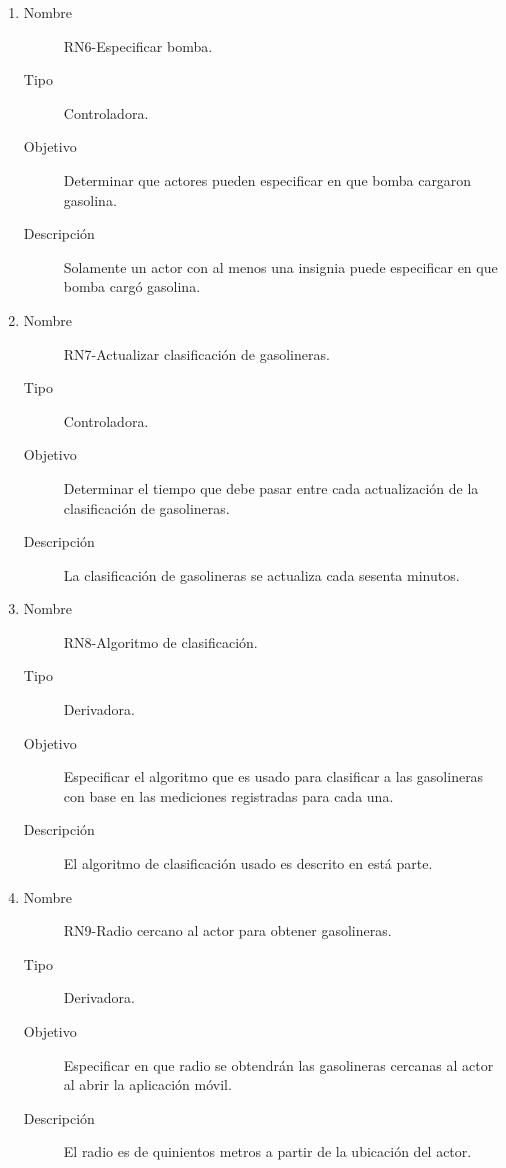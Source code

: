 \begin{enumerate}[label=RN\arabic*.]
\begin{description}
		\end{description}
	\item \label{RN6}
		\begin{description}
			\item[Nombre] RN6-Especificar bomba.
			\item[Tipo] Controladora.
			\item[Objetivo] Determinar que actores pueden especificar en que bomba cargaron gasolina.
			\item[Descripción] Solamente un actor con al menos una insignia puede especificar en que bomba cargó gasolina.
		\end{description}
	\item \label{RN7}
		\begin{description}
			\item[Nombre] RN7-Actualizar clasificación de gasolineras.
			\item[Tipo] Controladora.
			\item[Objetivo] Determinar el tiempo que debe pasar entre cada actualización de la clasificación de gasolineras.
			\item[Descripción] La clasificación de gasolineras se actualiza cada sesenta minutos.
		\end{description}
	\item \label{RN8}
		\begin{description}
			\item[Nombre] RN8-Algoritmo de clasificación.
			\item[Tipo] Derivadora.
			\item[Objetivo] Especificar el algoritmo que es usado para clasificar a las gasolineras con base en las mediciones registradas para cada una.
			\item[Descripción] El algoritmo de clasificación usado es descrito en está parte.
		\end{description}
	\item \label{RN9}
		\begin{description}
			\item[Nombre] RN9-Radio cercano al actor para obtener gasolineras.
			\item[Tipo] Derivadora.
			\item[Objetivo] Especificar en que radio se obtendrán las gasolineras cercanas al actor al abrir la aplicación móvil.
			\item[Descripción] El radio es de quinientos metros a partir de la ubicación del actor.
		\end{description}
\end{enumerate}